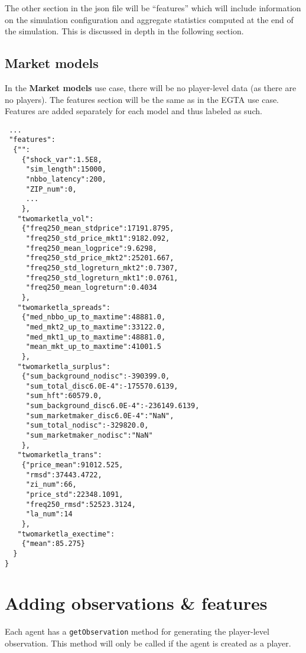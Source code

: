 \documentclass[11pt]{article}
\begin{document}
The other section in the json file will be ``features'' which will include information on the simulation configuration and aggregate statistics computed at the end of the simulation. This is discussed in depth in the following section.


\subsection{Market models}

In the \textbf{Market models} use case, there will be no player-level data (as there are no players). The features section will be the same as in the EGTA use case.
Features are added separately for each model and thus labeled as such.

\begin{verbatim}
 ...
 "features":
  {"":
    {"shock_var":1.5E8,
     "sim_length":15000,
     "nbbo_latency":200,
     "ZIP_num":0,
     ...
    },
   "twomarketla_vol":
    {"freq250_mean_stdprice":17191.8795,
     "freq250_std_price_mkt1":9182.092,
     "freq250_mean_logprice":9.6298,
     "freq250_std_price_mkt2":25201.667,
     "freq250_std_logreturn_mkt2":0.7307,
     "freq250_std_logreturn_mkt1":0.0761,
     "freq250_mean_logreturn":0.4034
    },
   "twomarketla_spreads":
    {"med_nbbo_up_to_maxtime":48881.0,
     "med_mkt2_up_to_maxtime":33122.0,
     "med_mkt1_up_to_maxtime":48881.0,
     "mean_mkt_up_to_maxtime":41001.5
    },
   "twomarketla_surplus":
    {"sum_background_nodisc":-390399.0,
     "sum_total_disc6.0E-4":-175570.6139,
     "sum_hft":60579.0,
     "sum_background_disc6.0E-4":-236149.6139,
     "sum_marketmaker_disc6.0E-4":"NaN",
     "sum_total_nodisc":-329820.0,
     "sum_marketmaker_nodisc":"NaN"
    },
   "twomarketla_trans":
    {"price_mean":91012.525,
     "rmsd":37443.4722,
     "zi_num":66,
     "price_std":22348.1091,
     "freq250_rmsd":52523.3124,
     "la_num":14
    },
   "twomarketla_exectime":
    {"mean":85.275}
  }
}

\end{verbatim}


\section{Adding observations \& features}

Each agent has a \verb|getObservation| method for generating the player-level observation. This method will only be called if the agent is created as a player.
\end{document}
